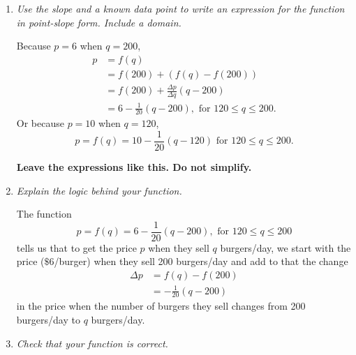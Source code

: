 \documentclass{ximera}
\newcommand{\pskip}{\vskip 0.1 in}
\begin{document}
\begin{example}
\begin{explanation}
\begin{enumerate}
\pskip

The rate of change in the price with with respect to the average number of burgers sold is
\[
   \frac{\Delta p}{\Delta q} = \frac{(10-6) \text{dollars/burger}}{(120-200) \text{burgers/day}} = -\frac{1}{20} \frac{\text{dollars/burger}}{\text{burgers/day} } .
\]
\emph{Interpretation:} For Five Guys to sell an average of $20$ more burgers/day they would need to lower the price by $\$1$/burger. Or for Five Guys to sell an average of $1$ more burger/day they would need to lower the price by $\$0.05$/burger. 

\pskip

\emph{Do not simplify the units, otherwise it will be impossible to interpret the rate of change.}

\item  \emph{Use the slope and a known data point to write an expression for the function in point-slope form. Include a domain.}

Because $p=6$ when $q=200$, 
\begin{align*}
  p   &= f(q)   \\
       & = f(200) + (f(q) - f(200)) \\
       &= f(200) + \frac{\Delta p}{\Delta q}\left(q - 200  \right) \\
      & = 6 - \frac{1}{20} \left( q - 200 \right) , \text{ for } 120\leq q \leq 200 . 
\end{align*}
Or  because $p=10$ when $q=120$, 
\[
  p = f(q) = 10 - \frac{1}{20} \left( q - 120 \right) \text{ for } 120\leq q \leq 200.
\]

{\bf Leave the expressions like this. Do not simplify.}

 

\item \emph{Explain the logic behind your function.}

The function
\[
   p = f(q) = 6 - \frac{1}{20} \left( q - 200 \right) , \text{ for } 120\leq q \leq 200
\]
tells us that to get the price $p$ when they sell $q$ burgers/day, we start with the price ($\$6$/burger) when they sell 200 burgers/day and add to that the change
\begin{align*}
   \Delta p &= f(q) - f(200) \\  
               &=-\frac{1}{20} \left( q - 200 \right)
\end{align*}
in the price when the number of burgers they sell changes from 200 burgers/day to $q$  burgers/day.

\item \emph{Check that your function is correct.}


\end{enumerate}
\end{explanation}
\end{example}
\end{document}
